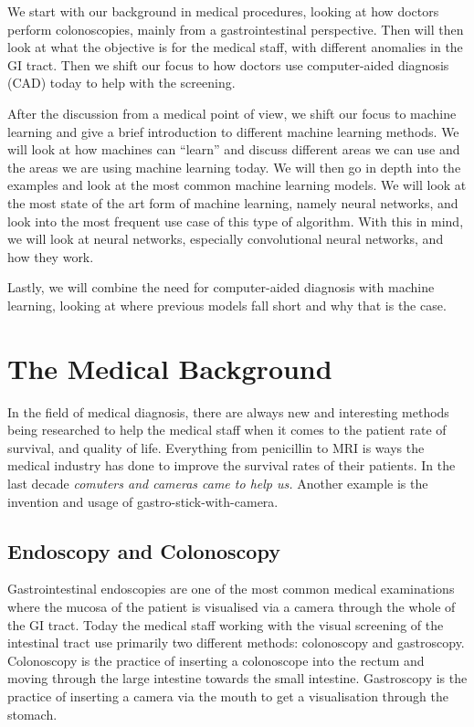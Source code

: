 We start with our background in medical procedures, looking at how doctors perform colonoscopies, mainly from a gastrointestinal perspective.
Then will then look at what the objective is for the medical staff, with different anomalies in the GI tract. Then we shift our focus to how doctors use computer-aided diagnosis (CAD) today to help with the screening. 

After the discussion from a medical point of view, we shift our focus to machine learning and give a brief introduction to different machine learning methods. We will look at how machines can ``learn'' and discuss different areas we can use and the areas we are using machine learning today. We will then go in depth into the examples and look at the most common machine learning models. We will look at the most state of the art form of machine learning, namely neural networks, and look into the most frequent use case of this type of algorithm.
With this in mind, we will look at neural networks, especially convolutional neural networks, and how they work.

Lastly, we will combine the need for computer-aided diagnosis with machine learning, looking at where previous models fall short and why that is the case.

\section{The Medical Background}
In the field of medical diagnosis, there are always new and interesting methods being researched to help the medical staff when it comes to the patient rate of survival, and quality of life. 
Everything from penicillin to MRI is ways the medical industry has done to improve the survival rates of their patients. 
In the last decade \textit{comuters and cameras came to help us.}
Another example is the invention and usage of gastro-stick-with-camera.


\subsection{Endoscopy and Colonoscopy}
Gastrointestinal endoscopies are one of the most common medical examinations where the mucosa of the patient is visualised via a camera through the whole of the GI tract. \cite{Holme13}
Today the medical staff working with the visual screening of the intestinal tract use primarily two different methods: colonoscopy and gastroscopy. 
Colonoscopy is the practice of inserting a colonoscope into the rectum and moving through the large intestine towards the small intestine.  Gastroscopy is the practice of inserting a camera via the mouth to get a visualisation through the stomach.

